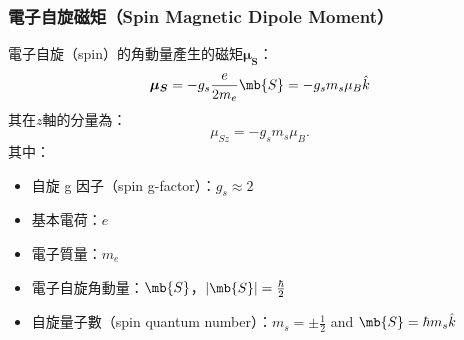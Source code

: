 \documentclass[a4paper,12pt]{report}
\begin{document}
\subsubsection{電子自旋磁矩（Spin Magnetic Dipole Moment）}
電子自旋（spin）的角動量產生的磁矩$\boldsymbol{\mu_S}$：
\[\boldsymbol{\mu_S}=-g_s\frac{e}{2m_e}\mb{S}=-g_sm_s\mu_B\hat{k}\]
其在$z$軸的分量為：
\[\mu_{Sz}=-g_sm_s\mu_B.\]
其中：
\begin{itemize}
\item 自旋 g 因子（spin g-factor）：$g_s\approx 2$
\item 基本電荷：$e$
\item 電子質量：$m_e$
\item 電子自旋角動量：$\mb{S}$，$|\mb{S}|=\frac{\hbar}{2}$
\item 自旋量子數（spin quantum number）：$m_s=\pm\frac{1}{2}$ and $\mb{S}=\hbar m_s\hat{k}$
\end{itemize}
\end{document}
